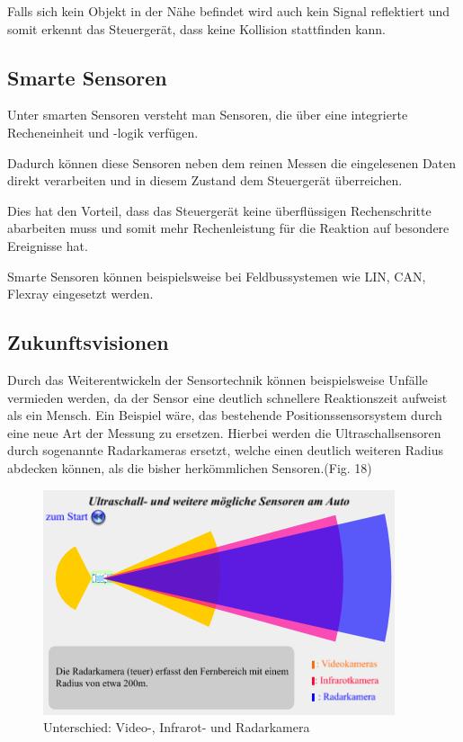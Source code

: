 \begin{flushleft}
	                 Falls sich kein Objekt in der Nähe befindet wird auch kein Signal reflektiert und somit erkennt das Steuergerät, dass keine Kollision stattfinden kann.
	
	                \subsection{Smarte Sensoren} 
	                 Unter smarten Sensoren versteht man Sensoren, die über eine integrierte Recheneinheit und -logik verfügen.
	                 
	                 Dadurch können diese Sensoren neben dem reinen Messen die eingelesenen Daten direkt verarbeiten und in diesem Zustand dem Steuergerät überreichen. 
	                 
	                 Dies hat den Vorteil, dass das Steuergerät keine überflüssigen Rechenschritte abarbeiten muss und somit mehr Rechenleistung für die Reaktion auf besondere Ereignisse hat.
	
	                 Smarte Sensoren können beispielsweise bei Feldbussystemen wie LIN, CAN, Flexray eingesetzt werden.		
	             	             
	             
	             \subsection{Zukunftsvisionen} 
	                  Durch das Weiterentwickeln der Sensortechnik können beispielsweise Unfälle vermieden werden, da der Sensor eine deutlich schnellere Reaktionszeit aufweist als ein Mensch.
	                  Ein Beispiel wäre, das bestehende Positionssensorsystem durch eine neue Art der Messung zu ersetzen. Hierbei werden die Ultraschallsensoren 
	                  durch sogenannte Radarkameras ersetzt, welche einen deutlich weiteren Radius abdecken können, als die bisher herkömmlichen Sensoren.(Fig. 18)
	                  
	                  \begin{figure}
	                      \includegraphics[width=\textwidth] {radarsensor.png}
	                      \caption[www.leifiphysik.de/akustik/schallgeschwindigkeit/ausblick/ultraschall-beim-auto]{Unterschied: Video-, Infrarot- und Radarkamera}
	                      \label{fig:TS12}
	                  \end{figure}
	     

\end{flushleft}
